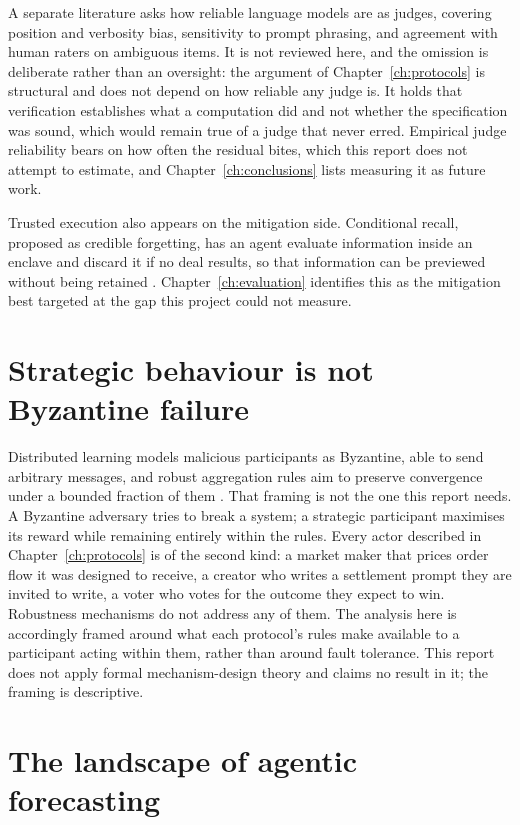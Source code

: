 A separate literature asks how reliable language models are as judges, covering position and
verbosity bias, sensitivity to prompt phrasing, and agreement with human raters on ambiguous
items. It is not reviewed here, and the omission is deliberate rather than an oversight: the
argument of Chapter~\ref{ch:protocols} is structural and does not depend on how reliable any
judge is. It holds that verification establishes what a computation did and not whether the
specification was sound, which would remain true of a judge that never erred. Empirical
judge reliability bears on how often the residual bites, which this report does not attempt
to estimate, and Chapter~\ref{ch:conclusions} lists measuring it as future work.

Trusted execution also appears on the mitigation side. Conditional recall, proposed as
credible forgetting, has an agent evaluate information inside an enclave and discard it if
no deal results, so that information can be previewed without being retained
\cite{mevsbc2026breakout}. Chapter~\ref{ch:evaluation} identifies this as the mitigation
best targeted at the gap this project could not measure.

\section{Strategic behaviour is not Byzantine failure}
\label{sec:bg-byz}

Distributed learning models malicious participants as Byzantine, able to send arbitrary
messages, and robust aggregation rules aim to preserve convergence under a bounded fraction
of them \cite{blanchard2017krum}. That framing is not the one this report needs. A Byzantine
adversary tries to break a system; a strategic participant maximises its reward while
remaining entirely within the rules. Every actor described in Chapter~\ref{ch:protocols} is
of the second kind: a market maker that prices order flow it was designed to receive, a
creator who writes a settlement prompt they are invited to write, a voter who votes for the
outcome they expect to win. Robustness mechanisms do not address any of them. The analysis
here is accordingly framed around what each protocol's rules make available to a participant
acting within them, rather than around fault tolerance. This report does not apply formal
mechanism-design theory and claims no result in it; the framing is descriptive.

\section{The landscape of agentic forecasting}
\label{sec:bg-landscape}

